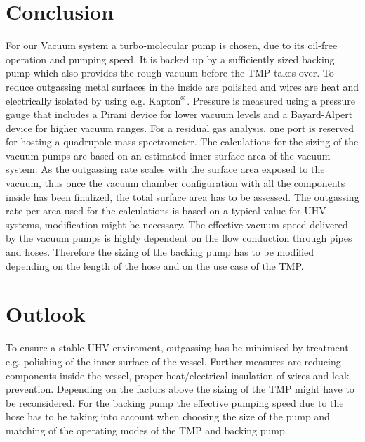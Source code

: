 \section{Conclusion}

For our Vacuum system a turbo-molecular pump is chosen, due to its oil-free operation and pumping speed.
It is backed up by a sufficiently sized backing pump which also provides the rough vacuum before the TMP takes over.
To reduce outgassing metal surfaces in the inside are polished and wires are heat and electrically isolated by using e.g. Kapton$\textsuperscript{\textregistered}$.
Pressure is measured using a pressure gauge that includes a Pirani device for lower vacuum levels and a Bayard-Alpert device for higher vacuum ranges.
For a residual gas analysis, one port is reserved for hosting a quadrupole mass spectrometer. The calculations for the sizing of the vacuum pumps are based on an estimated inner surface area of the vacuum system. As the outgassing rate scales with the surface area exposed to the vacuum, thus once the vacuum chamber configuration with all the components inside has been finalized, the total surface area has to be assessed. The outgassing rate per area used for the calculations is based on a typical value for UHV systems, modification might be necessary. The effective vacuum speed delivered by the vacuum pumps is highly dependent on the flow conduction through pipes and hoses. Therefore the sizing of the backing pump has to be modified depending on the length of the hose and on the use case of the TMP.


\section{Outlook}
To ensure a stable UHV enviroment, outgassing has be minimised by treatment e.g. polishing of the inner surface of the vessel. Further measures are reducing components inside the vessel, proper heat/electrical insulation of wires and leak prevention. Depending on the factors above the sizing of the TMP might have to be reconsidered. For the backing pump the effective pumping speed due to the hose has to be taking into account when choosing the size of the pump and matching of the operating modes of the TMP and backing pump.
